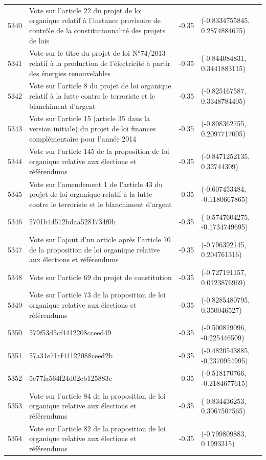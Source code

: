 \begin{table}[ht]
\begin{tabular}{rlrl}
  5340 & Vote sur l'article 22 du projet de loi organique relatif à l'instance provisoire de contrôle de la constitutionnalité des projets de lois & -0.35 & (-0.8334755845, 0.2874884675) \\ 
  5341 & Vote sur le titre du projet de loi N°74/2013 relatif à la production de l'électricité à partir des énergies renouvelables & -0.35 & (-0.844084831, 0.3441883115) \\ 
  5342 & Vote sur l'article 8 du projet de loi organique relatif à la lutte contre le terroriste et le blanchiment d'argent & -0.35 & (-0.825167587, 0.3348784405) \\ 
  5343 & Vote sur l'article 15 (article 35 dans la version initiale) du projet de loi finances complémentaire pour l'année 2014 & -0.35 & (-0.808362755, 0.2097717005) \\ 
  5344 & Vote sur l'article 145 de la proposition de loi organique relative aux élections et référendums & -0.35 & (-0.8471252135, 0.32744309) \\ 
  5345 & Vote sur l'amendement 1 de l'article 43 du projet de loi organique relatif à la lutte contre le terroriste et le blanchiment d'argent & -0.35 & (-0.607453484, -0.1180667865) \\ 
  5346 & 5701b44512bdaa5281734f0b & -0.35 & (-0.5747604275, -0.1734749695) \\ 
  5347 & Vote sur l'ajout d'un article après l'article 70 de la proposition de loi organique relative aux élections et référendums & -0.35 & (-0.796392145, 0.204761316) \\ 
  5348 & Vote sur l'article 69 du projet de constitution & -0.35 & (-0.727191157, 0.0123876969) \\ 
  5349 & Vote sur l'article 73 de la proposition de loi organique relative aux élections et référendums & -0.35 & (-0.8285480795, 0.350046527) \\ 
  5350 & 579f53d5cf4412208cceed49 & -0.35 & (-0.500819096, -0.225446509) \\ 
  5351 & 57a31e71cf44122088ceed2b & -0.35 & (-0.4820543885, -0.2370954995) \\ 
  5352 & 5c77fa564f24d02cb125883c & -0.35 & (-0.518170766, -0.2184677615) \\ 
  5353 & Vote sur l'article 84 de la proposition de loi organique relative aux élections et référendums & -0.35 & (-0.834436253, 0.3067507565) \\ 
  5354 & Vote sur l'article 82 de la proposition de loi organique relative aux élections et référendums & -0.35 & (-0.799809883, 0.1993315) \\ 

\end{tabular}
\end{table}
